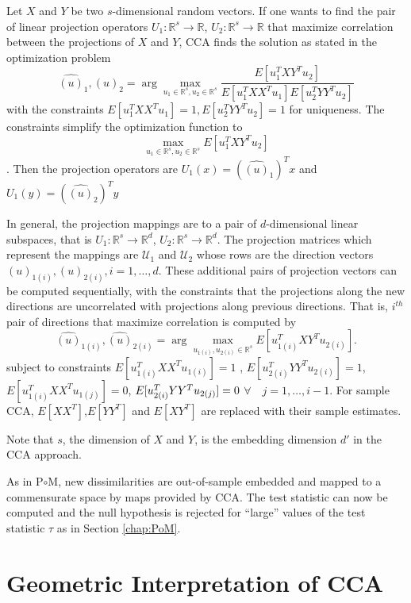 \documentclass[12pt,oneside,final]{thesis}\usepackage[]{graphicx}\usepackage[]{color}
\begin{document}
 Let $X$ and $Y$ be two $s$-dimensional random vectors. If  one wants to find  the pair of linear projection operators $U_1:\mathbb{R}^s \rightarrow  \mathbb{R}$, $U_2 :\mathbb{R}^s \rightarrow  \mathbb{R}$ that maximize correlation between the projections of   $X$ and $Y$, CCA finds the solution as stated in the  optimization problem
$$
{\hat{(u)}_1 ,\hat{(u)}_2}=\arg\max_{u_1\in\mathbb{R}^s,u_2\in\mathbb{R}^s} {\frac{E[u_1^{T}XY^Tu_2]}{{E[u_1^{T}XX^T u_1]}{E[u_2^{T}YY^T u_2]}}}$$
with the constraints $E[{u_1^{T}XX^T u_1}]=1 , E[{u_2^{T}YY^T u_2}]=1$ for uniqueness. The constraints simplify the optimization function to $$
\max_{u_1\in \mathbb{R}^s,u_2\in \mathbb{R}^s} {E[u_1^{T}XY^Tu_2]}$$. Then the projection operators are $U_1(x)=(\hat{(u)}_1)^{T} x$ and $U_1(y)=(\hat{(u)}_2)^{T} y$

In general, the projection mappings are to a pair of $d$-dimensional linear subspaces, that is $U_1:\mathbb{R}^s \rightarrow  \mathbb{R}^{d}$, $U_2 :\mathbb{R}^s \rightarrow  \mathbb{R}^{d}$. The projection matrices which represent the mappings are $\mathcal{U}_1$ and $\mathcal{U}_2$  whose rows are the direction vectors ${{(u)}_{1(i)},{(u)}_{2(i)}}, i=1,\ldots,d $. These additional pairs of projection vectors can be computed sequentially, with the constraints that the projections along the new directions are uncorrelated with  projections along previous directions. That is, $i^{th}$ pair of directions  that maximize correlation is computed by 
$$
{\hat{(u)}_{1(i)},\hat{(u)}_{2(i)}}=\arg\max_{u_{1(i)},u_{2(i)}\in\mathbb{R}^s} {E[u_{1(i)}^{T}XY^Tu_{2(i)}]}.$$ subject to constraints $E[{u_{1(i)}^{T}XX^T u_{1(i)}}]=1$ , $E[{u_{2(i)}^{T}YY^T u_{2(i)}}]=1$, $E[{u_{1(i)}^{T}XX^T u_{1(j)}}]=0$,  
   $ E[{u_{2(i)}^{T}YY^T u_{2(j)}}]=\nolinebreak0$ $\forall \quad  j=1,\ldots,i-1$. For sample CCA, $E[XX^T]$,$E[YY^T]$ and $E[XY^T]$ are replaced with their sample estimates.


Note that $s$, the dimension of $X$ and $Y$, is the embedding dimension $d'$  in the CCA approach. 


As in P$ \circ $M, new dissimilarities are out-of-sample embedded and mapped to a commensurate  space by maps provided by CCA. The test statistic   can now be computed and  the null hypothesis is rejected for ``large'' values of the test statistic $\tau$  as in Section \ref{chap:PoM}.



\section{Geometric Interpretation of CCA}
\end{document}
